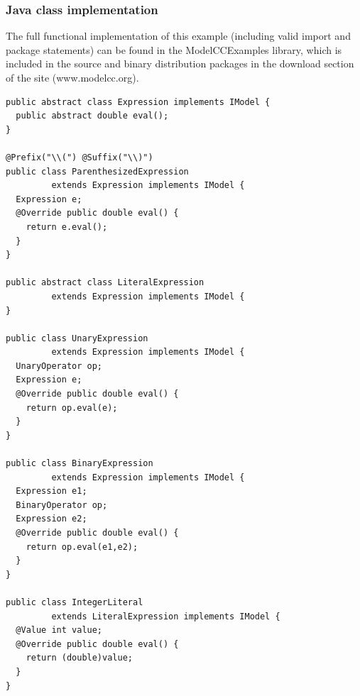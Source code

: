 \documentclass[a4paper,twoside,onecolumn]{article}
\newenvironment{colframe}{%
  \begin{Sbox} 
    \begin{minipage}{.8\columnwidth} 
}{%

  \end{minipage} 
  \end{Sbox} 
  \begin{center} 
    \fcolorbox{black}{MyGray}{\TheSbox} 
  \end{center} 
}
\begin{document}
\subsubsection{Java class implementation}
The full functional implementation of this example (including valid import and package statements) can be found in the ModelCCExamples library, which is included in the source and binary distribution packages in the download section of the site (www.modelcc.org).

\begin{colframe}
\begin{verbatim}
public abstract class Expression implements IModel {
  public abstract double eval();
}

@Prefix("\\(") @Suffix("\\)")
public class ParenthesizedExpression
         extends Expression implements IModel {
  Expression e;
  @Override public double eval() {
    return e.eval();
  }
}

public abstract class LiteralExpression
         extends Expression implements IModel {
}

public class UnaryExpression
         extends Expression implements IModel {
  UnaryOperator op;
  Expression e;
  @Override public double eval() {
    return op.eval(e);
  }
}

public class BinaryExpression
         extends Expression implements IModel {
  Expression e1;
  BinaryOperator op;
  Expression e2;
  @Override public double eval() {
    return op.eval(e1,e2);
  }
}

public class IntegerLiteral
         extends LiteralExpression implements IModel {
  @Value int value;
  @Override public double eval() {
    return (double)value;
  }
}
\end{verbatim}
\end{colframe}
\end{document}
